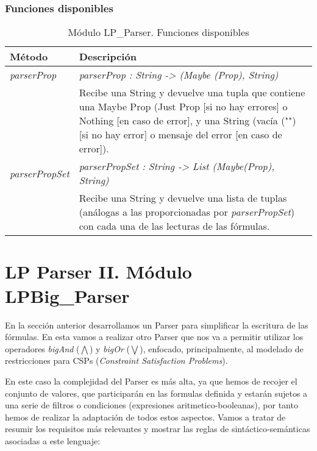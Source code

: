 \documentclass[a4paper]{report}
\begin{document}
\subsubsection{Funciones disponibles}

\begin{table}[H]
\centering
\begin{tabular}{p{3cm} p{13.2cm}}
\hline
Método & Descripción\\
\hline
\hline
\textit{parserProp}& \textit{parserProp : String -> (Maybe (Prop), String)}\\
& Recibe una String y devuelve una tupla que contiene una Maybe Prop (Just Prop [si no hay errores] o Nothing [en caso de error], y una String (vacía ("") [si no hay error] o mensaje del error [en caso de error]).\\
\hline
\textit{parserPropSet}& \textit{parserPropSet : String -> List (Maybe(Prop), String)}\\
& Recibe una String y devuelve una lista de tuplas (análogas a las proporcionadas por \textit{parserPropSet}) con cada una de las lecturas de las fórmulas.\\
\hline
\end{tabular}
\caption{Módulo LP\_Parser. Funciones disponibles}
\end{table}

\section{LP Parser II. Módulo LPBig\_Parser}
En la sección anterior desarrollamos un Parser para simplificar la escritura de las fórmulas. En esta vamos a realizar otro Parser que nos va a permitir utilizar los operadores \textit{bigAnd} ($\bigwedge$) y \textit{bigOr} ($\bigvee$), enfocado, principalmente, al modelado de restricciones para CSPs (\textit{Constraint Satisfaction Problems}).

En este caso la complejidad del Parser es más alta, ya que hemos de recojer el conjunto de valores, que participarán en las formulas definida y estarán sujetos a una serie de filtros o condiciones (expresiones aritmetico-booleanas), por tanto hemos de realizar la adaptación de todos estos aspectos. Vamos a tratar de resumir los requisitos más relevantes y mostrar las reglas de sintáctico-semánticas asociadas a este lenguaje:

\begin{itemize}

\end{itemize}
\end{document}
